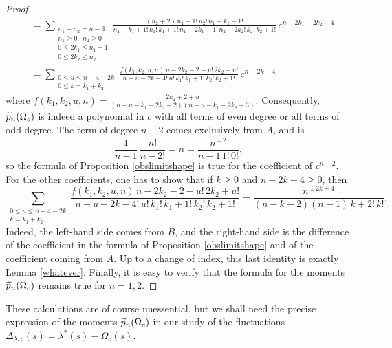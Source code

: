 \documentclass[10pt]{amsart}
\begin{document}
\begin{proof}
\begin{align*}
&=\!\!\!\!\!\!\sum_{\substack{n_{1}+n_{2}=n-3\\n_{1}\geq 0,\,\,n_{2}\geq 0\\0\leq 2k_{1}\leq n_{1}-1\\ 0 \leq 2k_{2} \leq n_{2}}}\frac{(n_{2}+2)\,n_{1}+1!\,n_{2}!\,n_{1}-k_{1}-1!}{n_{1}-k_{1}+1!\,k_{1}!\,k_{1}+1!\, n_{1}-2k_{1}-1!\,n_{2}-2k_{2}!\,k_{2}!\,k_{2}+1!}\,c^{n-2k_{1}-2k_{2}-4}\\
&=\!\!\!\!\!\!\sum_{\substack{0\leq u \leq n-4-2k\\0\leq k = k_{1}+k_{2}}} \frac{f(k_{1},k_{2},u,n)\,n-2k_{2}-2-u!\,2k_{2}+u!}{n-u-2k-4!\,u!\,k_{1}!\,k_{1}+1!\,k_{2}!\,k_{2}+1!}\,c^{n-2k-4}
\end{align*}
where $f(k_{1},k_{2},u,n)=\frac{2k_{2}+2+u}{(n-u-k_{1}-2k_{2}-2)(n-u-k_{1}-2k_{2}-3)}$. Consequently, $\widetilde{p}_{n}(\Omega_{c})$ is indeed a polynomial in $c$ with all terms of even degree or all terms of odd degree. The term of degree $n-2$ comes exclusively from $A$, and is 
$$\frac{1}{n-1}\,\frac{n!}{n-2!}=n=\frac{n^{\downarrow 2} }{n-1\,1!\,0!},$$
so the formula of Proposition \ref{obslimitshape} is true for the coefficient of $c^{n-2}$. For the other coefficients, one has to show that if $k\geq 0$ and $n-2k-4 \geq 0$, then
$$\sum_{\substack{0\leq u \leq n-4-2k\\ k = k_{1}+k_{2}}} \frac{f(k_{1},k_{2},u,n)\,n-2k_{2}-2-u!\,2k_{2}+u!}{n-u-2k-4!\,u!\,k_{1}!\,k_{1}+1!\,k_{2}!\,k_{2}+1!}=\frac{n^{\downarrow 2k+4}}{(n-k-2)(n-1)\,k+2!\,k!}.$$
Indeed, the left-hand side comes from $B$, and the right-hand side is the difference of the coefficient in the formula of Proposition \ref{obslimitshape} and of the coefficient coming from $A$. Up to a change of index, this last identity is exactly Lemma \ref{whatever}. Finally, it is easy to verify that the formula for the moments $\widetilde{p}_{n}(\Omega_{c})$ remains true for $n=1,2$.
\end{proof}
\bigskip

\noindent These calculations are of course unessential, but we shall need the precise expression of the moments $\widetilde{p}_{n}(\Omega_{c})$ in our study of the fluctuations $\Delta_{\lambda,c}(s)=\lambda^{*}(s)-\Omega_{c}(s)$.
\bigskip
\end{document}
